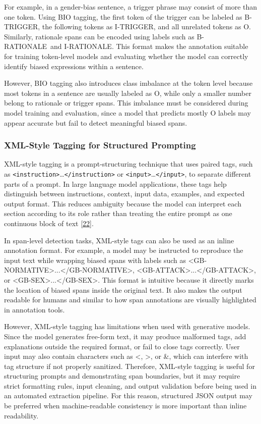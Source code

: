 \documentclass[12pt,oneside,openright,a4paper]{cpe-english-project}
\begin{document}
For example, in a gender-bias sentence, a trigger phrase may consist of more than one token. Using BIO tagging, the first token of the trigger can be labeled as B-TRIGGER, the following tokens as I-TRIGGER, and all unrelated tokens as O. Similarly, rationale spans can be encoded using labels such as B-RATIONALE~and I-RATIONALE. This format makes the annotation suitable for training token-level models and evaluating whether the model can correctly identify biased expressions within a sentence.

However, BIO tagging also introduces class imbalance at the token level because most tokens in a sentence are usually labeled as O, while only a smaller number belong to rationale or trigger spans. This imbalance must be considered during model training and evaluation, since a model that predicts mostly O labels may appear accurate but fail to detect meaningful biased spans.

\subsubsection{XML-Style Tagging for Structured Prompting}

XML-style tagging is a prompt-structuring technique that uses paired tags, such as \texttt{<instruction>}\ldots\texttt{</instruction>} or \texttt{<input>}\ldots\texttt{</input>}, to separate different parts of a prompt. In large language model applications, these tags help distinguish between instructions, context, input data, examples, and expected output format. This reduces ambiguity because the model can interpret each section according to its role rather than treating the entire prompt as one continuous block of text \hyperlink{bib:ref22}{[22]}.

In span-level detection tasks, XML-style tags can also be used as an inline annotation format. For example, a model may be instructed to reproduce the input text while wrapping biased spans with labels such as \textless GB-NORMATIVE\textgreater...\textless/GB-NORMATIVE\textgreater, \textless GB-ATTACK\textgreater...\textless/GB-ATTACK\textgreater, or \textless GB-SEX\textgreater...\textless/GB-SEX\textgreater. This format is intuitive because it directly marks the location of biased spans inside the original text. It also makes the output readable for humans and similar to how span annotations are visually highlighted in annotation tools.


However, XML-style tagging has limitations when used with generative models. Since the model generates free-form text, it may produce malformed tags, add explanations outside the required format, or fail to close tags correctly. User input may also contain characters such as \textless, \textgreater, or \&, which can interfere with tag structure if not properly sanitized. Therefore, XML-style tagging is useful for structuring prompts and demonstrating span boundaries, but it may require strict formatting rules, input cleaning, and output validation before being used in an automated extraction pipeline. For this reason, structured JSON output may be preferred when machine-readable consistency is more important than inline readability.
\end{document}
